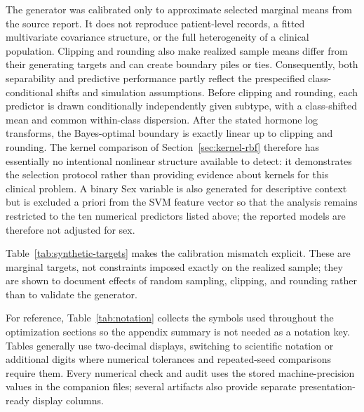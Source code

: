 \documentclass[11pt,a4paper]{article}
\numberwithin{equation}{section} %
\begin{document}
The generator was calibrated only to approximate selected marginal means from
the source report. It does not reproduce patient-level records, a fitted
multivariate covariance structure, or the full heterogeneity of a clinical
population. Clipping and rounding also make realized sample means differ from
their generating targets and can create boundary piles or ties. Consequently,
both separability and predictive performance partly reflect the prespecified
class-conditional shifts and simulation assumptions. Before clipping and
rounding, each predictor is drawn conditionally independently given subtype,
with a class-shifted mean and common within-class dispersion. After the stated
hormone log transforms, the Bayes-optimal boundary is exactly linear up to
clipping and rounding. The kernel comparison of Section~\ref{sec:kernel-rbf}
therefore has essentially no intentional nonlinear structure available to
detect: it demonstrates the selection protocol rather than providing evidence
about kernels for this clinical problem. A binary Sex variable is
also generated for descriptive context but is excluded a priori from the SVM
feature vector so that the analysis remains restricted to the ten numerical
predictors listed above; the reported models are therefore not adjusted for
sex.

Table~\ref{tab:synthetic-targets} makes the calibration mismatch explicit.
These are marginal targets, not constraints imposed exactly on the realized
sample; they are shown to document effects of random sampling, clipping, and
rounding rather than to validate the generator.

\begin{table}[htbp]
\centering
\caption{Generator calibration targets from the source-summary values versus
realized synthetic-cohort means. Diastolic blood pressure had no recorded
target in the generator and is therefore omitted.}
\label{tab:synthetic-targets}

\end{table}

For reference, Table~\ref{tab:notation} collects the symbols used throughout
the optimization sections so the appendix summary is not needed as a notation
key. Tables generally use two-decimal displays, switching to scientific
notation or additional digits where numerical tolerances and repeated-seed
comparisons require them. Every numerical check and audit uses the stored
machine-precision values in the companion  files; several
artifacts also provide separate presentation-ready display columns.
\end{document}
